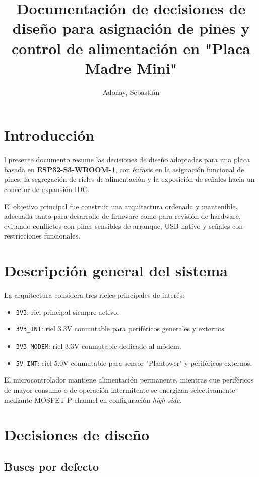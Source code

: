 \documentclass[9pt,a4paper,twocolumn,twoside]{rho-class/rho}
\title{Documentación de decisiones de diseño para asignación de pines y control de alimentación en "Placa Madre Mini"}
\author[{\textasteriskcentered},a]{Adonay, Sebastián}
\affil[a]{Centro de Investigación en Tecnologías para la Sociedad C+, Universidad del Desarrollo}
\begin{document}
\maketitle
\thispagestyle{firststyle}

\section{Introducción}

l presente documento resume las decisiones de diseño adoptadas para una placa basada en \textbf{ESP32-S3-WROOM-1}, con énfasis en la asignación funcional de pines, la segregación de rieles de alimentación y la exposición de señales hacia un conector de expansión IDC.

El objetivo principal fue construir una arquitectura ordenada y mantenible, adecuada tanto para desarrollo de firmware como para revisión de hardware, evitando conflictos con pines sensibles de arranque, USB nativo y señales con restricciones funcionales.

\section{Descripción general del sistema}

La arquitectura considera tres rieles principales de interés:

\begin{itemize}
    \item \texttt{3V3}: riel principal siempre activo.
    \item \texttt{3V3\_INT}: riel 3.3V conmutable para periféricos generales y externos.
    \item \texttt{3V3\_MODEM}: riel 3.3V conmutable dedicado al módem.
    \item \texttt{5V\_INT}: riel 5.0V conmutable para sensor "Plantower" y periféricos externos.
\end{itemize}

El microcontrolador mantiene alimentación permanente, mientras que periféricos de mayor consumo o de operación intermitente se energizan selectivamente mediante MOSFET P-channel en configuración \textit{high-side}.

\section{Decisiones de diseño}

\subsection{Buses por defecto}
\end{document}
